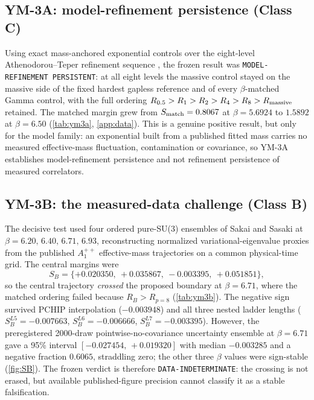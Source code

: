 \documentclass[11pt,a4paper]{article}
\theoremstyle{definition}
\theoremstyle{remark}
\begin{document}
\subsection{YM-3A: model-refinement persistence (Class C)}
Using exact mass-anchored exponential controls over the eight-level Athenodorou--Teper refinement sequence \cite{AT20}, the frozen result was \texttt{MODEL-\allowbreak{}REFINEMENT PERSISTENT}: at all eight levels the massive control stayed on the massive side of the fixed hardest gapless reference and of every $\beta$-matched Gamma control, with the full ordering $R_{0.5}>R_1>R_2>R_4>R_8>R_{\rm massive}$ retained. The matched margin grew from $S_{\rm match}=0.8067$ at $\beta=5.6924$ to $1.5892$ at $\beta=6.50$ (\cref{tab:ym3a}, \cref{app:data}). This is a genuine positive result, but only for the model family: an exponential built from a published fitted mass carries no measured effective-mass fluctuation, contamination or covariance, so YM-3A establishes model-refinement persistence and not refinement persistence of measured correlators.

\subsection{YM-3B: the measured-data challenge (Class B)}
The decisive test used four ordered pure-SU(3) ensembles of Sakai and Sasaki \cite{SS23} at $\beta=6.20,\,6.40,\,6.71,\,6.93$, reconstructing normalized variational-eigenvalue proxies from the published $A_1^{++}$ effective-mass trajectories on a common physical-time grid. The central margins were
\begin{equation}
S_B=\{+0.020350,\ +0.035867,\ -0.003395,\ +0.051851\},
\end{equation}
so the central trajectory \emph{crossed} the proposed boundary at $\beta=6.71$, where the matched ordering failed because $R_B>R_{p=8}$ (\cref{tab:ym3b}). The negative sign survived PCHIP interpolation ($-0.003948$) and all three nested ladder lengths ($S_B^{L5}=-0.007663$, $S_B^{L6}=-0.006666$, $S_B^{L7}=-0.003395$). However, the preregistered 2000-draw pointwise-no-covariance uncertainty ensemble at $\beta=6.71$ gave a 95\% interval $[-0.027454,\,+0.019320]$ with median $-0.003285$ and a negative fraction $0.6065$, straddling zero; the other three $\beta$ values were sign-stable (\cref{fig:SB}). The frozen verdict is therefore \texttt{DATA-\allowbreak{}INDETERMINATE}: the crossing is not erased, but available published-figure precision cannot classify it as a stable falsification.
\end{document}
